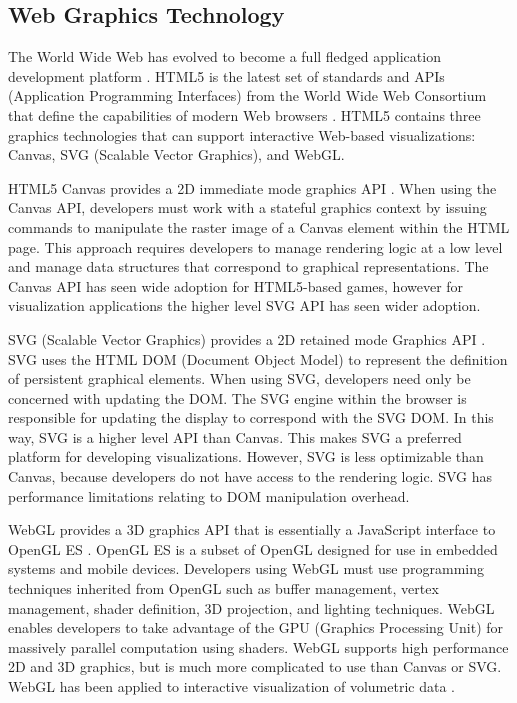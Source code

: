 \subsection{Web Graphics Technology}
The World Wide Web has evolved to become a full fledged application development platform \cite{pilgrim2010html5}. HTML5 is the latest set of standards and APIs (Application Programming Interfaces) from the World Wide Web Consortium that define the capabilities of modern Web browsers \cite{html5}. HTML5 contains three graphics technologies that can support interactive Web-based visualizations: Canvas, SVG (Scalable Vector Graphics), and WebGL.

HTML5 Canvas provides a 2D immediate mode graphics API \cite{fulton2013html5}. When using the Canvas API, developers must work with a stateful graphics context by issuing commands to manipulate the raster image of a Canvas element within the HTML page. This approach requires developers to manage rendering logic at a low level and manage data structures that correspond to graphical representations. The Canvas API has seen wide adoption for HTML5-based games, however for visualization applications the higher level SVG API has seen wider adoption.

SVG (Scalable Vector Graphics) provides a 2D retained mode Graphics API \cite{svg}. SVG uses the HTML DOM (Document Object Model) to represent the definition of persistent graphical elements. When using SVG, developers need only be concerned with updating the DOM. The SVG engine within the browser is responsible for updating the display to correspond with the SVG DOM. In this way, SVG is a higher level API than Canvas. This makes SVG a preferred platform for developing visualizations. However, SVG is less optimizable than Canvas, because developers do not have access to the rendering logic. SVG has performance limitations relating to DOM manipulation overhead.

WebGL provides a 3D graphics API that is essentially a JavaScript interface to OpenGL ES \cite{matsuda2013webgl}. OpenGL ES is a subset of OpenGL designed for use in embedded systems and mobile devices. Developers using WebGL must use programming techniques inherited from OpenGL such as buffer management, vertex management, shader definition, 3D projection, and lighting techniques. WebGL enables developers to take advantage of the GPU (Graphics Processing Unit) for massively parallel computation using shaders. WebGL supports high performance 2D and 3D graphics, but is much more complicated to use than Canvas or SVG. WebGL has been applied to interactive visualization of volumetric data \cite{congote2011interactive}.

